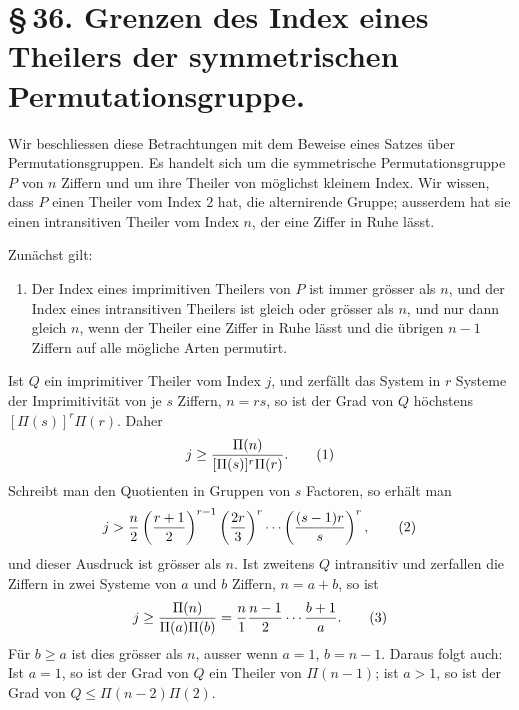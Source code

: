 \documentclass[11pt]{article}
\begin{document}
\section*{\S\,36. Grenzen des Index eines Theilers der symmetrischen Permutationsgruppe.}

Wir beschliessen diese Betrachtungen mit dem Beweise eines Satzes über Permutationsgruppen. Es handelt sich um die symmetrische Permutationsgruppe $P$ von $n$ Ziffern und um ihre Theiler von möglichst kleinem Index. Wir wissen, dass $P$ einen Theiler vom Index $2$ hat, die alternirende Gruppe; ausserdem hat sie einen intransitiven Theiler vom Index $n$, der eine Ziffer in Ruhe lässt.

Zunächst gilt:
\begin{enumerate}[label=\Roman*.,leftmargin=2.4em]
\item Der Index eines imprimitiven Theilers von $P$ ist immer grösser als $n$, und der Index eines intransitiven Theilers ist gleich oder grösser als $n$, und nur dann gleich $n$, wenn der Theiler eine Ziffer in Ruhe lässt und die übrigen $n-1$ Ziffern auf alle mögliche Arten permutirt.
\end{enumerate}
Ist $Q$ ein imprimitiver Theiler vom Index $j$, und zerfällt das System in $r$ Systeme der Imprimitivität von je $s$ Ziffern, $n=rs$, so ist der Grad von $Q$ höchstens $[\Pi(s)]^r\Pi(r)$. Daher
\begin{equation}
j\ge {\Pi(n)\over [\Pi(s)]^r\Pi(r)}.
\tag{1}
\end{equation}
Schreibt man den Quotienten in Gruppen von $s$ Factoren, so erhält man
\begin{equation}
j>{n\over2}\left({r+1\over2}\right)^{r-1}\left({2r\over3}\right)^r\cdots
\left({(s-1)r\over s}\right)^r,
\tag{2}
\end{equation}
und dieser Ausdruck ist grösser als $n$. Ist zweitens $Q$ intransitiv und zerfallen die Ziffern in zwei Systeme von $a$ und $b$ Ziffern, $n=a+b$, so ist
\begin{equation}
j\ge {\Pi(n)\over \Pi(a)\Pi(b)}={n\over1}{n-1\over2}\cdots {b+1\over a}.
\tag{3}
\end{equation}
Für $b\ge a$ ist dies grösser als $n$, ausser wenn $a=1$, $b=n-1$. Daraus folgt auch: Ist $a=1$, so ist der Grad von $Q$ ein Theiler von $\Pi(n-1)$; ist $a>1$, so ist der Grad von $Q\le \Pi(n-2)\Pi(2)$.
\end{document}
